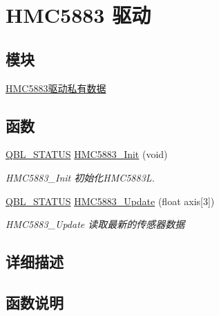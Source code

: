 \hypertarget{group__hmc5883__driver}{}\section{H\+M\+C5883 驱动}
\label{group__hmc5883__driver}
\subsection*{模块}
\begin{DoxyCompactItemize}
\item 
\hyperlink{group__hmc5883__driver__private}{H\+M\+C5883驱动私有数据}
\end{DoxyCompactItemize}
\subsection*{函数}
\begin{DoxyCompactItemize}
\item 
\hyperlink{group__qbl_ga41526b685f55486191108499fe91c30b}{Q\+B\+L\+\_\+\+S\+T\+A\+T\+US} \hyperlink{group__hmc5883__driver_ga23d45753863d03d2e20ad4175965cb75}{H\+M\+C5883\+\_\+\+Init} (void)
\begin{DoxyCompactList}\small\item\em H\+M\+C5883\+\_\+\+Init 初始化\+H\+M\+C5883L. \end{DoxyCompactList}\item 
\hyperlink{group__qbl_ga41526b685f55486191108499fe91c30b}{Q\+B\+L\+\_\+\+S\+T\+A\+T\+US} \hyperlink{group__hmc5883__driver_gab380fb39719ca6cd76c4277cd0a8e1c8}{H\+M\+C5883\+\_\+\+Update} (float axis\mbox{[}3\mbox{]})
\begin{DoxyCompactList}\small\item\em H\+M\+C5883\+\_\+\+Update 读取最新的传感器数据 \end{DoxyCompactList}\end{DoxyCompactItemize}


\subsection{详细描述}


\subsection{函数说明}
